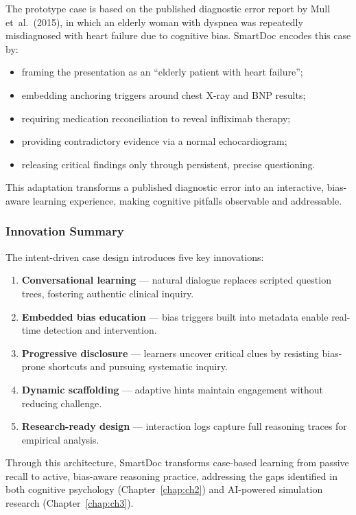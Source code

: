 The prototype case is based on the published diagnostic error report by
Mull et~al.~(2015), in which an elderly woman with dyspnea was repeatedly
misdiagnosed with heart failure due to cognitive bias.
SmartDoc encodes this case by:

\begin{itemize}
  \item framing the presentation as an ``elderly patient with heart failure'';
  \item embedding anchoring triggers around chest X-ray and BNP results;
  \item requiring medication reconciliation to reveal infliximab therapy;
  \item providing contradictory evidence via a normal echocardiogram;
  \item releasing critical findings only through persistent, precise questioning.
\end{itemize}

This adaptation transforms a published diagnostic error into an interactive,
bias-aware learning experience, making cognitive pitfalls observable and
addressable.

\subsubsection{Innovation Summary}

The intent-driven case design introduces five key innovations:

\begin{enumerate}
  \item \textbf{Conversational learning} — natural dialogue replaces scripted
  question trees, fostering authentic clinical inquiry.
  \item \textbf{Embedded bias education} — bias triggers built into metadata
  enable real-time detection and intervention.
  \item \textbf{Progressive disclosure} — learners uncover critical clues by
  resisting bias-prone shortcuts and pursuing systematic inquiry.
  \item \textbf{Dynamic scaffolding} — adaptive hints maintain engagement
  without reducing challenge.
  \item \textbf{Research-ready design} — interaction logs capture full reasoning
  traces for empirical analysis.
\end{enumerate}

Through this architecture, SmartDoc transforms case-based learning from passive
recall to active, bias-aware reasoning practice, addressing the gaps identified in
both cognitive psychology (Chapter~\ref{chap:ch2}) and AI-powered simulation research
(Chapter~\ref{chap:ch3}).

